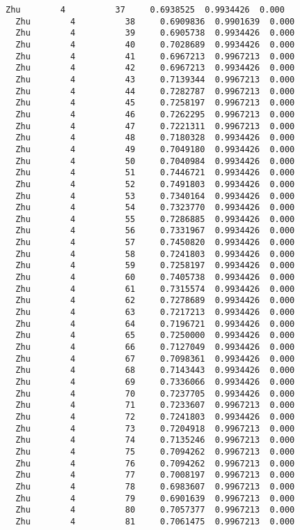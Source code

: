 \documentclass[11pt]{article}
\begin{document}
\begin{Verbatim}[commandchars=\\\{\}]
  Zhu        4          37     0.6938525  0.9934426  0.000
  Zhu        4          38     0.6909836  0.9901639  0.000
  Zhu        4          39     0.6905738  0.9934426  0.000
  Zhu        4          40     0.7028689  0.9934426  0.000
  Zhu        4          41     0.6967213  0.9967213  0.000
  Zhu        4          42     0.6967213  0.9934426  0.000
  Zhu        4          43     0.7139344  0.9967213  0.000
  Zhu        4          44     0.7282787  0.9967213  0.000
  Zhu        4          45     0.7258197  0.9967213  0.000
  Zhu        4          46     0.7262295  0.9967213  0.000
  Zhu        4          47     0.7221311  0.9967213  0.000
  Zhu        4          48     0.7180328  0.9934426  0.000
  Zhu        4          49     0.7049180  0.9934426  0.000
  Zhu        4          50     0.7040984  0.9934426  0.000
  Zhu        4          51     0.7446721  0.9934426  0.000
  Zhu        4          52     0.7491803  0.9934426  0.000
  Zhu        4          53     0.7340164  0.9934426  0.000
  Zhu        4          54     0.7323770  0.9934426  0.000
  Zhu        4          55     0.7286885  0.9934426  0.000
  Zhu        4          56     0.7331967  0.9934426  0.000
  Zhu        4          57     0.7450820  0.9934426  0.000
  Zhu        4          58     0.7241803  0.9934426  0.000
  Zhu        4          59     0.7258197  0.9934426  0.000
  Zhu        4          60     0.7405738  0.9934426  0.000
  Zhu        4          61     0.7315574  0.9934426  0.000
  Zhu        4          62     0.7278689  0.9934426  0.000
  Zhu        4          63     0.7217213  0.9934426  0.000
  Zhu        4          64     0.7196721  0.9934426  0.000
  Zhu        4          65     0.7250000  0.9934426  0.000
  Zhu        4          66     0.7127049  0.9934426  0.000
  Zhu        4          67     0.7098361  0.9934426  0.000
  Zhu        4          68     0.7143443  0.9934426  0.000
  Zhu        4          69     0.7336066  0.9934426  0.000
  Zhu        4          70     0.7237705  0.9934426  0.000
  Zhu        4          71     0.7233607  0.9967213  0.000
  Zhu        4          72     0.7241803  0.9934426  0.000
  Zhu        4          73     0.7204918  0.9967213  0.000
  Zhu        4          74     0.7135246  0.9967213  0.000
  Zhu        4          75     0.7094262  0.9967213  0.000
  Zhu        4          76     0.7094262  0.9967213  0.000
  Zhu        4          77     0.7008197  0.9967213  0.000
  Zhu        4          78     0.6983607  0.9967213  0.000
  Zhu        4          79     0.6901639  0.9967213  0.000
  Zhu        4          80     0.7057377  0.9967213  0.000
  Zhu        4          81     0.7061475  0.9967213  0.000

\end{Verbatim}
\end{document}
